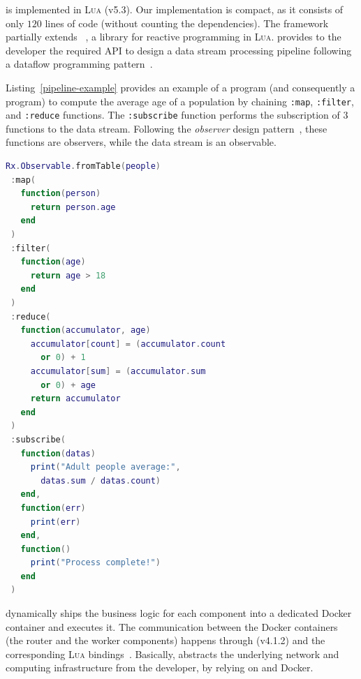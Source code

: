 \SYS{} is implemented in \textsc{Lua} (v5.3).
Our implementation is compact, as it consists of only $120$ lines of code (without counting the dependencies).
The framework partially extends \rxl~\cite{github:rxlua}, a library for reactive programming in \textsc{Lua}.
\rxl provides to the developer the required API to design a data stream processing pipeline following a dataflow programming pattern~\cite{uustalu_essence_2005}.

Listing~\ref{pipeline-example} provides an example of a \rxl program (and consequently a \SYS{} program) to compute the average age of a population by chaining \texttt{:map}, \texttt{:filter}, and \texttt{:reduce} functions.
The \texttt{:subscribe} function performs the subscription of 3 functions to the data stream.
Following the \emph{observer} design pattern~\cite{szallies_using_1997}, these functions are observers, while the data stream is an observable.

\begin{lstlisting}[language=LUA,caption={Example of process pipeline with RxLua.},label=pipeline-example]
Rx.Observable.fromTable(people)
 :map(
   function(person)
     return person.age
   end
 )
 :filter(
   function(age)
     return age > 18
   end
 )
 :reduce(
   function(accumulator, age)
     accumulator[count] = (accumulator.count
       or 0) + 1
     accumulator[sum] = (accumulator.sum
       or 0) + age
     return accumulator
   end
 )
 :subscribe(
   function(datas)
     print("Adult people average:",
       datas.sum / datas.count)
   end,
   function(err)
     print(err)
   end,
   function()
     print("Process complete!")
   end
 )
\end{lstlisting}

\SYS{} dynamically ships the business logic for each component into a dedicated Docker container and executes it.
The communication between the Docker containers (the router and the worker components) happens through \zmq (v4.1.2) and the corresponding \textsc{Lua} bindings~\cite{github:lzmq}.
Basically, \SYS{} abstracts the underlying network and computing infrastructure from the developer, by relying on \zmq and Docker.

